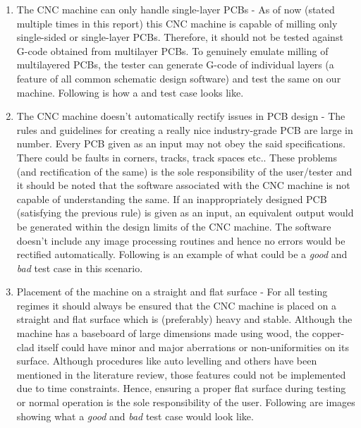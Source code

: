 \begin{enumerate}
    \item The CNC machine can only handle single-layer PCBs - As of now (stated multiple times in this report) this CNC machine is capable of milling only single-sided or single-layer PCBs. Therefore, it should not be tested against G-code obtained from multilayer PCBs. To genuinely emulate milling of multilayered PCBs, the tester can generate G-code of individual layers (a feature of all common schematic design software) and test the same on our machine. Following is how a  and  test case looks like.

    
    \item The CNC machine doesn’t automatically rectify issues in PCB design - The rules and guidelines for creating a really nice industry-grade PCB are large in number. Every PCB given as an input may not obey the said specifications. There could be faults in corners, tracks, track spaces etc.. These problems (and rectification of the same) is the sole responsibility of the user/tester and it should be noted that the software associated with the CNC machine is not capable of understanding the same. If an inappropriately designed PCB (satisfying the previous rule) is given as an input, an equivalent output would be generated within the design limits of the CNC machine. The software doesn’t include any image processing routines and hence no errors would be rectified automatically. Following is an example of what could be a \textit{good} and \textit{bad} test case in this scenario.
    
    
    \item Placement of the machine on a straight and flat surface - For all testing regimes it should always be ensured that the CNC machine is placed on a straight and flat surface which is (preferably) heavy and stable. Although the machine has a baseboard of large dimensions made using wood, the copper-clad itself could have minor and major aberrations or non-uniformities on its surface. Although procedures like auto levelling and others have been mentioned in the literature review, those features could not be implemented due to time constraints. Hence, ensuring a proper flat surface during testing or normal operation is the sole responsibility of the user. Following are images showing what a \textit{good} and \textit{bad} test case would look like.


\end{enumerate}

